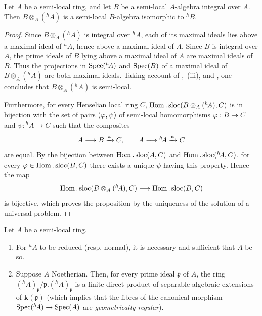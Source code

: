 \begin{proposition}[18.6.8]
\label{IV.18.6.8}
Let $A$ be a semi-local ring, and let $B$ be a semi-local $A$-algebra integral over $A$.
Then $B\otimes_{A}({}^h\!A)$ is a semi-local $B$-algebra isomorphic to ${}^h\!B$.
\end{proposition}

\begin{proof}
Since $B\otimes_{A}({}^h\!A)$ is integral over ${}^h\!A$, each of its maximal ideals lies above a maximal ideal of ${}^h\!A$, hence above a maximal ideal of $A$.  Since $B$ is integral over $A$, the prime ideals of $B$ lying above a maximal ideal of $A$ are maximal ideals of $B$.  Thus the projections in $\operatorname{Spec}({}^h\!A)$ and $\operatorname{Spec}(B)$ of a maximal ideal of $B\otimes_{A}({}^h\!A)$ are both maximal ideals.  Taking account of ,~(iii), and , one concludes that $B\otimes_{A}({}^h\!A)$ is semi-local.

Furthermore, for every Henselian local ring $C$, $\operatorname{Hom}.\operatorname{sloc}(B\otimes_{A}({}^h\!A),C)$ is in bijection with the set of pairs $(\varphi,\psi)$ of semi-local homomorphisms $\varphi:B\to C$ and $\psi:{}^h\!A\to C$ such that the composites
\[
  A\longrightarrow B\xrightarrow{\varphi}C,
  \qquad
  A\longrightarrow{}^h\!A\xrightarrow{\psi}C
\]
are equal.  By the bijection between $\operatorname{Hom}.\operatorname{sloc}(A,C)$ and $\operatorname{Hom}.\operatorname{sloc}({}^h\!A,C)$, for every $\varphi\in\operatorname{Hom}.\operatorname{sloc}(B,C)$ there exists a unique $\psi$ having this property.  Hence the map
\[
  \operatorname{Hom}.\operatorname{sloc}(B\otimes_{A}({}^h\!A),C)
  \longrightarrow \operatorname{Hom}.\operatorname{sloc}(B,C)
\]
is bijective, which proves the proposition by the uniqueness of the solution of a universal problem.
\end{proof}

\begin{theorem}[18.6.9]
\label{IV.18.6.9}
Let $A$ be a semi-local ring.
\begin{enumerate}[label=\emph{\roman*)}]
  \item For ${}^h\!A$ to be reduced \textup{(resp.} normal\textup{)}, it is necessary and sufficient that $A$ be so.
  \item Suppose $A$ Noetherian.
  Then, for every prime ideal $\mathfrak{p}$ of $A$, the ring $({}^h\!A)_{\mathfrak{p}}/\mathfrak{p}.({}^h\!A)_{\mathfrak{p}}$ is a finite direct product of separable algebraic extensions of $\boldsymbol{k}(\mathfrak{p})$ \textup{(which implies that the fibres of the canonical morphism $\operatorname{Spec}({}^h\!A)\to\operatorname{Spec}(A)$ are \emph{geometrically regular})}.
\end{enumerate}
\end{theorem}

